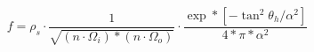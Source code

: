 \begin{equation}
     f = {{\rho_{s}}
     	\cdot{
        	\frac{1}{ \sqrt{ ({n}\cdot{\Omega_{i}}) * ({n}\cdot{\Omega_{o}}) } } } }
        \cdot{ \frac{ \exp*[-\tan^{2}{\theta_{h}} / \alpha^2] }{ 4*\pi*\alpha^2} }
\end{equation}